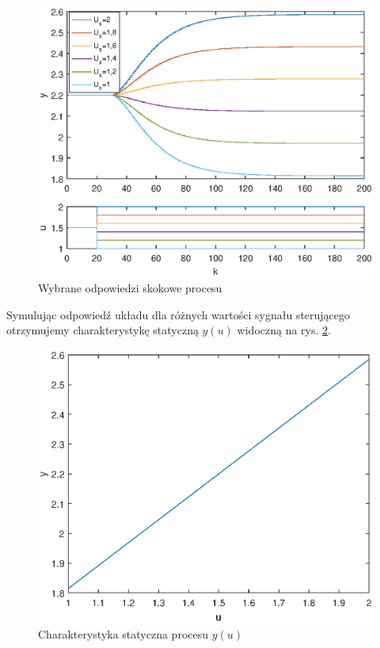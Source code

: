 \begin{figure}[ht]
\centering
\includegraphics[scale=1]{images/Z2multiplesteps}
\caption{Wybrane odpowiedzi skokowe procesu}
\label{Z2multiplesteps}
\end{figure}

Symulując odpowiedź układu dla różnych wartości sygnału sterującego otrzymujemy charakterystykę statyczną $y(u)$ widoczną na rys. \ref{Z2staticchar}.


\begin{figure}[ht]
\centering
\includegraphics[scale=1]{images/Z2staticchar}
\caption{Charakterystyka statyczna procesu $y(u)$}
\label{Z2staticchar}
\end{figure}


